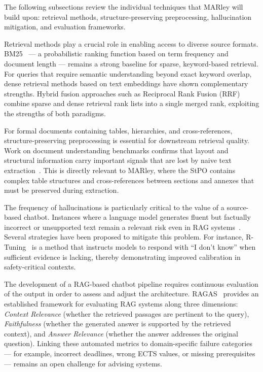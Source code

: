 \documentclass[10pt,twocolumn]{article}
\begin{document}
The following subsections review the individual techniques that MARley will build upon: retrieval methods, structure-preserving preprocessing, hallucination mitigation, and evaluation frameworks.

Retrieval methods play a crucial role in enabling access to diverse source formats. BM25~\cite{robertson2009bm25} --- a probabilistic ranking function based on term frequency and document length --- remains a strong baseline for sparse, keyword-based retrieval. For queries that require semantic understanding beyond exact keyword overlap, dense retrieval methods based on text embeddings have shown complementary strengths. Hybrid fusion approaches such as Reciprocal Rank Fusion (RRF)~\cite{cormack2009rrf} combine sparse and dense retrieval rank lists into a single merged rank, exploiting the strengths of both paradigms.

For formal documents containing tables, hierarchies, and cross-references, structure-preserving preprocessing is essential for downstream retrieval quality. Work on document understanding benchmarks confirms that layout and structural information carry important signals that are lost by naive text extraction~\cite{borchmann2021due}. This is directly relevant to MARley, where the StPO contains complex table structures and cross-references between sections and annexes that must be preserved during extraction.

The frequency of hallucinations is particularly critical to the value of a source-based chatbot. Instances where a language model generates fluent but factually incorrect or unsupported text remain a relevant risk even in RAG systems~\cite{ji2023hallucination}. Several strategies have been proposed to mitigate this problem. For instance, R-Tuning~\cite{zhang2024rtuning} is a method that instructs models to respond with ``I don't know'' when sufficient evidence is lacking, thereby demonstrating improved calibration in safety-critical contexts.

The development of a RAG-based chatbot pipeline requires continuous evaluation of the output in order to assess and adjust the architecture. RAGAS~\cite{es2025ragas} provides an established framework for evaluating RAG systems along three dimensions: \emph{Context Relevance} (whether the retrieved passages are pertinent to the query), \emph{Faithfulness} (whether the generated answer is supported by the retrieved context), and \emph{Answer Relevance} (whether the answer addresses the original question). Linking these automated metrics to domain-specific failure categories --- for example, incorrect deadlines, wrong ECTS values, or missing prerequisites --- remains an open challenge for advising systems.
\end{document}
